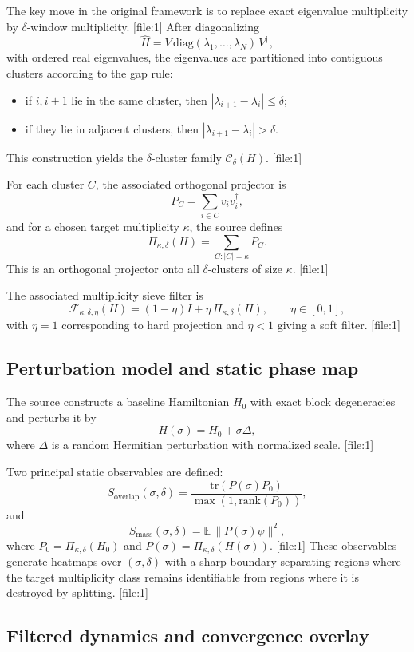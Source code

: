 \documentclass[11pt]{article}
\begin{document}
The key move in the original framework is to replace exact eigenvalue multiplicity by $\delta$-window multiplicity. [file:1] After diagonalizing
\[
\widehat H = V\,\mathrm{diag}(\lambda_1,\ldots,\lambda_N)\,V^{\dagger},
\]
with ordered real eigenvalues, the eigenvalues are partitioned into contiguous clusters according to the gap rule:
\begin{itemize}
    \item if $i,i+1$ lie in the same cluster, then $|\lambda_{i+1}-\lambda_i|\le \delta$;
    \item if they lie in adjacent clusters, then $|\lambda_{i+1}-\lambda_i|>\delta$.
\end{itemize}
This construction yields the $\delta$-cluster family $\mathcal C_{\delta}(H)$. [file:1]

For each cluster $C$, the associated orthogonal projector is
\[
P_C = \sum_{i\in C} v_i v_i^{\dagger},
\]
and for a chosen target multiplicity $\kappa$, the source defines
\[
\Pi_{\kappa,\delta}(H) = \sum_{C: |C|=\kappa} P_C.
\]
This is an orthogonal projector onto all $\delta$-clusters of size $\kappa$. [file:1]

The associated multiplicity sieve filter is
\[
\mathcal F_{\kappa,\delta,\eta}(H) = (1-\eta)I + \eta\,\Pi_{\kappa,\delta}(H), \qquad \eta\in[0,1],
\]
with $\eta=1$ corresponding to hard projection and $\eta<1$ giving a soft filter. [file:1]

\subsection{Perturbation model and static phase map}

The source constructs a baseline Hamiltonian $H_0$ with exact block degeneracies and perturbs it by
\[
H(\sigma) = H_0 + \sigma\Delta,
\]
where $\Delta$ is a random Hermitian perturbation with normalized scale. [file:1]

Two principal static observables are defined:
\[
S_{\mathrm{overlap}}(\sigma,\delta) = \frac{\mathrm{tr}(P(\sigma)P_0)}{\max(1,\mathrm{rank}(P_0))},
\]
and
\[
S_{\mathrm{mass}}(\sigma,\delta) = \mathbb E\,\|P(\sigma)\psi\|^2,
\]
where $P_0=\Pi_{\kappa,\delta}(H_0)$ and $P(\sigma)=\Pi_{\kappa,\delta}(H(\sigma))$. [file:1] These observables generate heatmaps over $(\sigma,\delta)$ with a sharp boundary separating regions where the target multiplicity class remains identifiable from regions where it is destroyed by splitting. [file:1]

\subsection{Filtered dynamics and convergence overlay}
\end{document}
